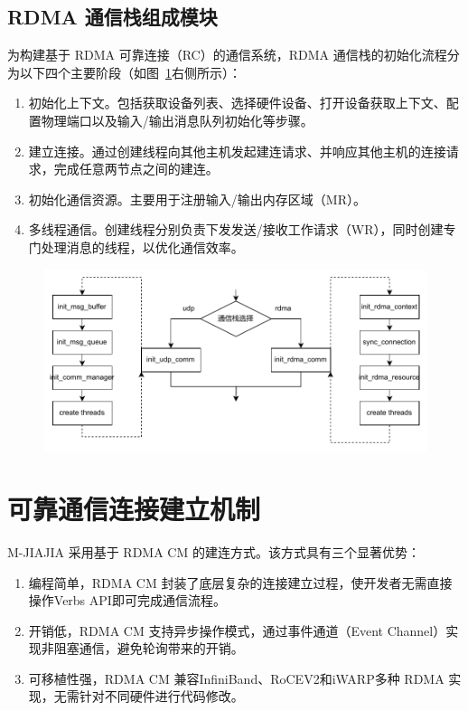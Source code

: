 {    \subsection{RDMA 通信栈组成模块}

    为构建基于 RDMA 可靠连接（RC）的通信系统，RDMA 通信栈的初始化流程分为以下四个主要阶段（如图~\ref{fig:mjiajia-rdma-modules}右侧所示）：
    \begin{enumerate}[label=\arabic*.]
        \item 初始化上下文。包括获取设备列表、选择硬件设备、打开设备获取上下文、配置物理端口以及输入/输出消息队列初始化等步骤。
        \item 建立连接。通过创建线程向其他主机发起建连请求、并响应其他主机的连接请求，完成任意两节点之间的建连。
        \item 初始化通信资源。主要用于注册输入/输出内存区域（MR）。
        \item 多线程通信。创建线程分别负责下发发送/接收工作请求（WR），同时创建专门处理消息的线程，以优化通信效率。
    \end{enumerate}

    \begin{figure}[!htbp]
        \centering
        \includegraphics[width=\textwidth]{Img/MJIAJIA通信栈.drawio.pdf}
        \label{fig:mjiajia-rdma-modules}
    \end{figure}

    \section{可靠通信连接建立机制}\label{sec:可靠通信连接建立机制}
    M-JIAJIA 采用基于 RDMA CM 的建连方式。该方式具有三个显著优势：
    \begin{enumerate}[label=\arabic*.]
        \item 编程简单，RDMA CM 封装了底层复杂的连接建立过程，使开发者无需直接操作Verbs API即可完成通信流程。
        \item 开销低，RDMA CM 支持异步操作模式，通过事件通道（Event Channel）实现非阻塞通信，避免轮询带来的开销。
        \item 可移植性强，RDMA CM 兼容InfiniBand、RoCEV2和iWARP多种 RDMA 实现，无需针对不同硬件进行代码修改。
    \end{enumerate}

}
